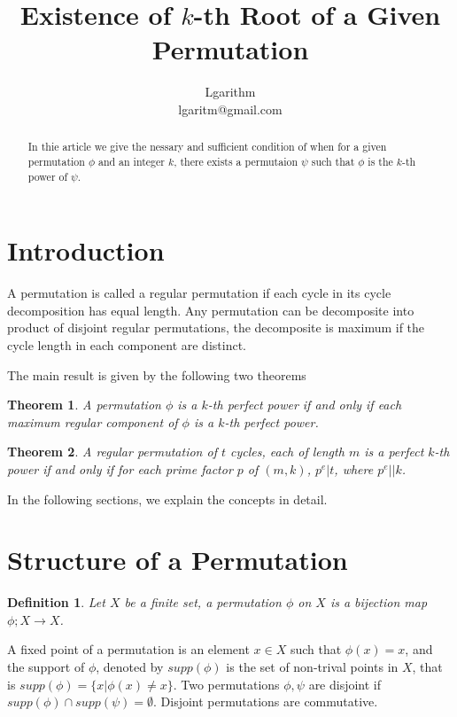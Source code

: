 \documentclass{article}
\title{Existence of $k$-th Root of a Given Permutation}
\author{Lgarithm\\\mbox{lgaritm@gmail.com}}
\newtheorem{defi}{Definition}
\newtheorem{thm}{Theorem}
\def\supp{supp}
\begin{document}
\maketitle

\begin{abstract}
In thie article we give the nessary and sufficient condition of
when for a given permutation $\phi$ and an integer $k$, there exists
a permutaion $\psi$ such that $\phi$ is the $k$-th power of $\psi$.
\end{abstract}

\section{Introduction}
A permutation is called a regular permutation if each cycle
in its cycle decomposition has equal length.
Any permutation can be decomposite into product of disjoint
regular permutations, the decomposite is maximum if the cycle length
in each component are distinct.

The main result is given by the following two theorems
\begin{thm}
A permutation $\phi$ is a $k$-th perfect power if and only if
each maximum regular component of $\phi$ is a $k$-th perfect power.
\end{thm}

\begin{thm}
A regular permutation of $t$ cycles, each of length $m$ is a perfect $k$-th power
if and only if for each prime factor $p$ of $(m, k)$, $p^e \vert t$,
where $p^e \vert\vert k$.
\end{thm}

In the following sections, we explain the concepts in detail.

\section{Structure of a Permutation}
\begin{defi}
Let $X$ be a finite set, a permutation $\phi$ on $X$ is a
bijection map $\phi ; X \to X$.
\end{defi}

A fixed point of a permutation is an element $x \in X$ such that
$\phi(x) = x$, and the support of $\phi$, denoted by $\supp(\phi)$
is the set of non-trival points in $X$,
that is $\supp(\phi) = \{x \vert \phi(x) \neq x\}$.
Two permutations $\phi, \psi$ are disjoint if $\supp(\phi) \cap \supp(\psi) = \emptyset$.
Disjoint permutations are commutative.
\end{document}
